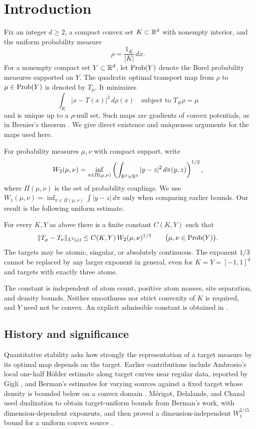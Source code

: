 \section{Introduction}

Fix an integer \(d\ge2\), a compact convex set \(K\subset\mathbb R^d\) with
nonempty interior, and the uniform probability measure
\[
 \rho=\frac{1_K}{|K|}\,dx.
\]
For a nonempty compact set \(Y\subset\mathbb R^d\), let \(\operatorname{Prob}(Y)\) denote the
Borel probability measures supported on \(Y\). The quadratic optimal
transport map from \(\rho\) to \(\mu\in\operatorname{Prob}(Y)\) is denoted by \(T_\mu\).
It minimizes
\[
 \int_K |x-T(x)|^2\,d\rho(x)
 \quad\text{subject to }T_\#\rho=\mu
\]
and is unique up to a \(\rho\)-null set. Such maps are gradients of convex
potentials, as in Brenier's theorem \cite{Brenier1991}. We give direct
existence and uniqueness arguments for the maps used here.

For probability measures \(\mu,\nu\) with compact support, write
\[
 W_2(\mu,\nu)
 =\inf_{\pi\in\Pi(\mu,\nu)}
   \left(\int_{\mathbb R^d\times\mathbb R^d}|y-z|^2\,d\pi(y,z)\right)^{1/2},
\]
where \(\Pi(\mu,\nu)\) is the set of probability couplings. We use
\(W_1(\mu,\nu)=\inf_{\pi\in\Pi(\mu,\nu)}\int|y-z|\,d\pi\)
only when comparing earlier bounds. Our result is the following uniform
estimate.

\begin{theorem}\label{main:stability}
For every \(K,Y\) as above there is a finite constant \(C(K,Y)\) such that
\[
 \|T_\mu-T_\nu\|_{L^2(\rho)}
 \le C(K,Y)\,W_2(\mu,\nu)^{1/3}
 \qquad\bigl(\mu,\nu\in\operatorname{Prob}(Y)\bigr).
\]
The targets may be atomic, singular, or absolutely continuous. The
exponent \(1/3\) cannot be replaced by any larger exponent in general,
even for \(K=Y=[-1,1]^d\) and targets with exactly three atoms.
\end{theorem}

The constant is independent of atom count, positive atom masses, site
separation, and density bounds. Neither smoothness nor strict convexity
of \(K\) is required, and \(Y\) need not be convex. An explicit admissible
constant is obtained in .

\subsection{History and significance}

Quantitative stability asks how strongly the representation of a target
measure by its optimal map depends on the target. Earlier contributions
include Ambrosio's local one-half H\"older estimate along target curves
near regular data, reported by Gigli
\cite[Corollary~3.4]{Gigli2011}, and Berman's estimates for varying
sources against a fixed target whose density is bounded below on a
convex domain \cite{Berman2021}. M\'erigot, Delalande, and Chazal
used dualization to obtain target-uniform bounds from Berman's work,
with dimension-dependent exponents, and then proved a
dimension-independent \(W_1^{2/15}\) bound for a uniform convex source
\cite[Corollary~2.4 and Theorem~3.1]{MerigotDelalandeChazal2020}.

